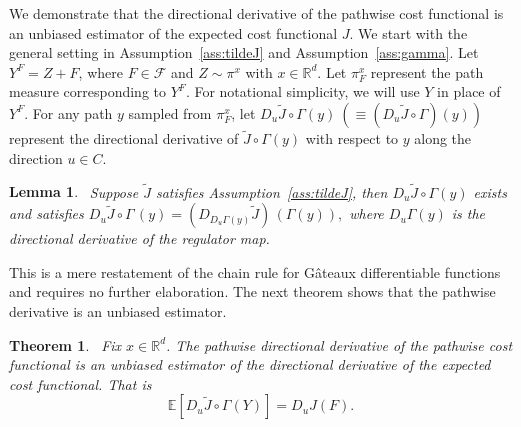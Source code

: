 \documentclass[11pt,leqno]{amsart}
\newtheorem{theorem}{Theorem}
\newtheorem{lemma}{Lemma}
\begin{document}
We demonstrate that the directional derivative of the pathwise cost functional is an unbiased estimator of the expected cost functional $J$. We start with the general setting in Assumption~\ref{ass:tildeJ} and Assumption~\ref{ass:gamma}. Let $Y^F = Z+F$, where $F \in \mathcal F$ and $Z \sim \pi^x$ with $x\in\mathbb R^d$. Let $\pi_F^x$ represent the path measure corresponding to $Y^F$. For notational simplicity, we will use $Y$ in place of $Y^F$. %
For any path $y$ sampled from $\pi_F^x$, let $D_u\tilde{J}\circ\Gamma(y)~(\equiv (D_u \tilde J \circ \Gamma) (y))$ represent the directional derivative of $\tilde{J}\circ\Gamma(y)$ with respect to $y$ along the direction $u\in C$.
\begin{lemma}~\label{lem:chain-rule}
     Suppose $\tilde{J}$ satisfies Assumption~\ref{ass:tildeJ}, then  $D_u\tilde{J}\circ\Gamma(y)$ exists and satisfies
     \(
         D_u\tilde{J}\circ\Gamma\,(y) = \left(D_{D_u\Gamma(y)}\tilde{J} \right)\,(\Gamma(y)),
    \)
     where $D_u\Gamma(y)$ is the directional derivative of the regulator map.
\end{lemma}
This is a mere restatement of the chain rule for G\^{a}teaux differentiable functions and requires no further elaboration. The next theorem shows that the pathwise derivative is an unbiased estimator.

\begin{theorem}~\label{thm:objective-derivative}
    Fix $x \in \mathbb R^d$. The pathwise directional derivative of the pathwise cost functional is an unbiased estimator of the directional derivative of the expected cost functional. That is
    $$\mathbb E\left[ D_u \tilde J \circ \Gamma (Y) \right] = D_u J(F).$$
\end{theorem}
\end{document}
